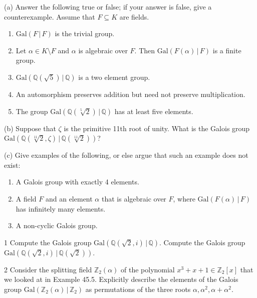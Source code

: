 \begin{problem}[Warmup]{(a)}
    Answer the following true or false; if your answer is false, give a counterexample. Assume that $F \subseteq K$ are fields.
    \begin{enumerate}
        \item[(a)] $\mathrm{Gal}(F \,|\, F)$ is the trivial group.
        \item[(b)] Let $\alpha \in K \setminus F$ and $\alpha$ is algebraic over $F$. Then $\mathrm{Gal}(F(\alpha) \,|\, F)$ is a finite group.
        \item[(c)] $\mathrm{Gal}(\mathbb{Q}(\sqrt{5}) \,|\, \mathbb{Q})$ is a two element group.
        \item[(d)] An automorphism preserves addition but need not preserve multiplication.
        \item[(e)] The group $\mathrm{Gal}(\mathbb{Q}(\sqrt[5]{2}) \,|\, \mathbb{Q})$ has at least five elements.
    \end{enumerate}
\end{problem}
\unsolved

\begin{problem}[Warmup]{(b)}
    Suppose that $\zeta$ is the primitive 11th root of unity. What is the Galois group $\mathrm{Gal}(\mathbb{Q}(\sqrt[11]{2}, \zeta) \,|\, \mathbb{Q}(\sqrt[11]{2}))$?
\end{problem}
\unsolved

\begin{problem}[Warmup]{(c)}
    Give examples of the following, or else argue that such an example does not exist:
    \begin{enumerate}
        \item[(a)] A Galois group with exactly 4 elements.
        \item[(b)] A field $F$ and an element $\alpha$ that is algebraic over $F$, where $\mathrm{Gal}(F(\alpha) \,|\, F)$ has infinitely many elements.
        \item[(c)] A non-cyclic Galois group.
    \end{enumerate}
\end{problem}
\unsolved

\begin{problem}{1}
    Compute the Galois group
    $\mathrm{Gal}(\mathbb{Q}(\sqrt{2}, i) \,|\, \mathbb{Q})$. Compute the Galois group
    $\mathrm{Gal}(\mathbb{Q}(\sqrt{2}, i) \,|\, \mathbb{Q}(\sqrt{2}))$.
\end{problem}
\unsolved

\begin{problem}{2}
    Consider the splitting field $\mathbb{Z}_2(\alpha)$ of the polynomial
    $x^3 + x + 1 \in \mathbb{Z}_2[x]$ that we looked at in Example 45.5. Explicitly
    describe the elements of the Galois group
    $\mathrm{Gal}(\mathbb{Z}_2(\alpha) \,|\, \mathbb{Z}_2)$ as permutations of the three
    roots $\alpha, \alpha^2, \alpha + \alpha^2$.
\end{problem}
\unsolved


